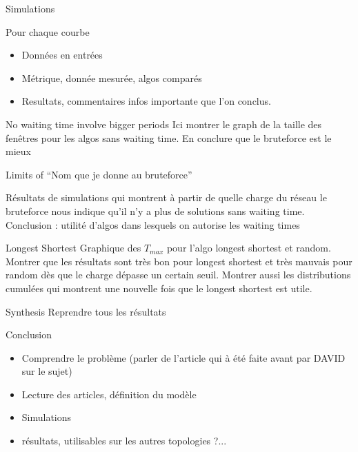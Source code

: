 \documentclass[a4paper,10pt,openany]{book}
\begin{document}
\begin{chapter}{Simulations}


\begin{section}{Pour chaque courbe}
\begin{itemize}
 \item Données en entrées
 \item Métrique, donnée mesurée, algos comparés
 \item Resultats, commentaires infos importante que l'on conclus.
\end{itemize}
\end{section}

\begin{section}{No waiting time involve bigger periods}
Ici montrer le graph de la taille des fenêtres pour les algos sans waiting time.
 En conclure que le bruteforce est le mieux
\end{section}

\begin{section}{Limits of ``Nom que je donne au bruteforce''}

 Résultats de simulations qui montrent à partir de quelle charge du réseau le bruteforce nous indique qu'il n'y 
 a plus de solutions sans waiting time.
Conclusion : utilité d'algos dans lesquels on autorise les waiting times
\end{section}

\begin{section}{Longest Shortest}
Graphique des $T_{max}$ pour l'algo longest shortest et random.
Montrer que les résultats sont très bon pour longest shortest et très mauvais pour random dès que le charge dépasse un certain seuil.
Montrer aussi les distributions cumulées qui montrent une nouvelle fois que le longest shortest est utile.
\end{section}

\begin{section}{Synthesis}
Reprendre tous les résultats
\end{section}

\end{chapter}



\begin{chapter}{Conclusion}
\begin{itemize}
 \item Comprendre le problème (parler de l'article qui à été faite avant par DAVID sur le sujet)
 \item Lecture des articles, définition du modèle
 \item Simulations
 \item résultats, utilisables sur les autres topologies ?...
\end{itemize}



\end{chapter}
\end{document}
